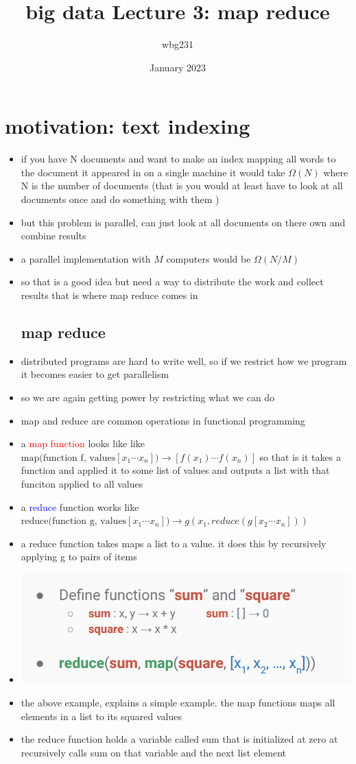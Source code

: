 \documentclass{article}
\title{big data Lecture 3: map reduce}
\author{wbg231 }
\date{January 2023}
\begin{document}
\maketitle

\section{motivation: text indexing}
\begin{itemize}
    \item if you have N documents and want to make an index mapping all words to the document it appeared in on a single machine it would take $\Omega(N)$ where N is the number of documents (that is you would at least have to look at all documents once and do something with them )
    \item but this problem is parallel, can just look at all documents on there own and combine results
    \item a parallel implementation with $M$ computers would be $\Omega(N/M)$
    \item so that is a good idea but need a way to distribute the work and collect results that is where map reduce comes in 
\subsection*{map reduce}
\item distributed programs are hard to write well, so if we restrict how we program it becomes easier to get parallelism
\item so we are again getting power by restricting what we can do 
\item map and reduce are common operations in functional programming 
\item a  \textcolor{red}{map function} looks like like $ \text{map(function f, values}[x_1\cdots x_n])\rightarrow[f(x_1)\cdots f(x_n)]$ so that is it takes a function and applied it to some list of values and outputs a list with that funciton applied to all values
\item a \textcolor{blue}{reduce} function works like $\text{reduce(function g, values}[x_1\cdots x_n]) \rightarrow g(x_1, reduce(g[x_2\cdots x_n]))$
\item a reduce function takes maps a list to a value. it does this by recursively applying g to pairs of items
\item \includegraphics{images/Screenshot 2023-05-08 at 4.51.32 PM.png}
\item the above example, explains a simple example. the map functions maps all elements in a list to its squared values
\item the reduce function holds a variable called sum that is initialized at zero at recursively calls sum on that variable and the next list element

\end{itemize}
\end{document}

